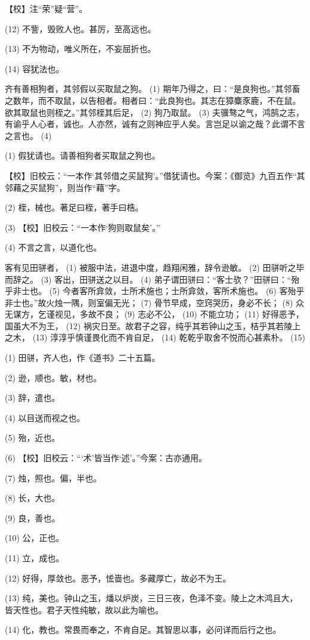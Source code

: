 \documentclass[12pt,UTF8]{ctexbook}
\begin{document}
【校】注“荣”疑“营”。

(12) 不訾，毁败人也。甚厉，至高远也。

(13) 不为物动，唯义所在，不妄屈折也。

(14) 容犹法也。

齐有善相狗者，其邻假以买取鼠之狗。 (1) 期年乃得之，曰：“是良狗也。”其邻畜之数年，而不取鼠，以告相者。相者曰：“此良狗也。其志在獐麋豕鹿，不在鼠。欲其取鼠也则桎之。”其邻桎其后足， (2) 狗乃取鼠。 (3) 夫骥骜之气，鸿鹄之志，有谕乎人心者，诚也。人亦然，诚有之则神应乎人矣。言岂足以谕之哉？此谓不言之言也。 (4)

(1) 假犹请也。请善相狗者买取鼠之狗也。

【校】旧校云：“一本作‘其邻借之买鼠狗’。”借犹请也。今案：《御览》九百五作“其邻藉之买鼠狗”，则当作“藉”字。

(2) 桎，械也。著足曰桎，著手曰梏。

(3) 【校】旧校云：“一本作‘狗则取鼠矣’。”

(4) 不言之言，以道化也。

客有见田骈者， (1) 被服中法，进退中度，趋翔闲雅，辞令逊敏。 (2) 田骈听之毕而辞之。 (3) 客出，田骈送之以目。 (4) 弟子谓田骈曰：“客士欤？”田骈曰：“殆乎非士也。 (5) 今者客所弇敛，士所术施也；士所弇敛，客所术施也。 (6) 客殆乎非士也。”故火烛一隅，则室偏无光； (7) 骨节早成，空窍哭历，身必不长； (8) 众无谋方，乞谨视见，多故不良； (9) 志必不公， (10) 不能立功； (11) 好得恶予，国虽大不为王， (12) 祸灾日至。故君子之容，纯乎其若钟山之玉，桔乎其若陵上之木， (13) 淳淳乎慎谨畏化而不肯自足， (14) 乾乾乎取舍不悦而心甚素朴。 (15)

(1) 田骈，齐人也，作《道书》二十五篇。

(2) 逊，顺也。敏，材也。

(3) 辞，遣也。

(4) 以目送而视之也。

(5) 殆，近也。

(6) 【校】旧校云：“‘术’皆当作‘述’。”今案：古亦通用。

(7) 烛，照也。偏，半也。

(8) 长，大也。

(9) 良，善也。

(10) 公，正也。

(11) 立，成也。

(12) 好得，厚敛也。恶予，恡啬也。多藏厚亡，故必不为王。

(13) 纯，美也。钟山之玉，燔以炉炭，三日三夜，色泽不变。陵上之木鸿且大，皆天性也。君子天性纯敏，故以此为喻也。

(14) 化，教也。常畏而奉之，不肯自足。其智思以事，必问详而后行之也。
\end{document}

